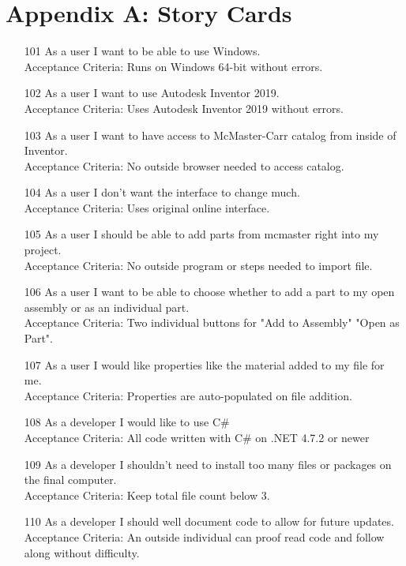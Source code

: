 \documentclass[12pt, letterpaper]{article}
\begin{document}
\section{Appendix A: Story Cards}
\begin{itemize}
    \item [101] As a user I want to be able to use Windows.\\
    Acceptance Criteria: Runs on Windows 64-bit without errors.
    \item [102] As a user I want to use Autodesk Inventor 2019.\\
    Acceptance Criteria: Uses Autodesk Inventor 2019 without errors.
    \item [103] As a user I want to have access to McMaster-Carr catalog from inside of Inventor.\\
    Acceptance Criteria: No outside browser needed to access catalog.
    \item [104] As a user I don't want the interface to change much.\\
    Acceptance Criteria: Uses original online interface.
    \item [105] As a user I should be able to add parts from mcmaster right into my project.\\
    Acceptance Criteria: No outside program or steps needed to import file.
    \item [106] As a user I want to be able to choose whether to add a part to my open
    assembly or as an individual part.\\
    Acceptance Criteria: Two individual buttons for "Add to Assembly" "Open as Part".
    \item [107] As a user I would like properties like the material added to my file for me.\\
    Acceptance Criteria: Properties are auto-populated on file addition.
    \item [108] As a developer I would like to use C\# \\
    Acceptance Criteria: All code written with C\# on .NET 4.7.2 or newer
    \item [109] As a developer I shouldn't need to install too many files or packages on the final computer.\\
    Acceptance Criteria: Keep total file count below 3.
    \item [110] As a developer I should well document code to allow for future updates.\\
    Acceptance Criteria: An outside individual can proof read code and follow along without difficulty.
\end{itemize}
\end{document}
